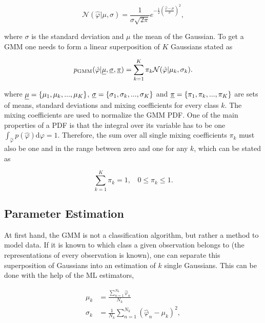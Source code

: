 \begin{equation}
\mathcal{N}(\hat{\varphi}|\mu,\sigma)=\frac{1}{\sigma\sqrt{2\pi}}e^{-\frac{1}{2}(\frac{\hat{\varphi}-\mu}{\sigma})^2},
\end{equation}

where $\sigma$ is the standard deviation and $\mu$ the mean of the Gaussian.
To get a \ac{GMM} one needs to form a linear superposition of $K$ Gaussians stated as

\begin{equation}
p_{\text{GMM}}(\hat{\varphi}|\underline{\mu},\underline{\sigma},\underline{\pi})= \sum^K_{k=1}\pi_k\mathcal{N}(\hat{\varphi}|\mu_k,\sigma_k).
\label{eq:gmm}
\end{equation}

where $\underline{\mu} = \{\mu_1, \mu_k,...,\mu_K \}$, $\underline{\sigma} = \{\sigma_1, \sigma_k,...,\sigma_K \}$ and $\underline{\pi} = \{\pi_1, \pi_k,...,\pi_K \}$ are sets of means, standard deviations and mixing coefficients for every class $k$. The mixing coefficients are used to normalize the \ac{GMM} \ac{PDF}. One of the main properties of a \ac{PDF} is that the integral over its variable has to be one $\int_{\hat \varphi} p(\hat \varphi) \mathrm{d} \varphi =1$. Therefore, the sum over all  single mixing coefficients $\pi_k$ must also be one and in the range between zero and one for any $k$, which can be stated as

\begin{equation}
\sum^K_{k=1}\pi_k = 1, \ \ \ \ 0 \leqslant \pi_k \leqslant 1.
\label{eq:pi_constraint}
\end{equation}

\subsection{Parameter Estimation}
\label{subsec:parameter_est}

At first hand, the GMM is not a classification algorithm, but rather a method to model data.
If it is known to which class a given observation belongs to (the representations of every observation is known), one can separate this superposition of Gaussians into an estimation of $k$ single Gaussians. This can be done with the help of the \ac{ML} estimators,

\begin{equation}
\begin{split}
\mu_k &= \frac{\sum^{N_k}_{n=1}\hat{\varphi}_n}{N_k}\\
\sigma_k &= \frac{1}{N_k}\sum^{N_k}_{n=1}(\hat{\varphi}_n-\mu_k)^2,
\end{split}
\end{equation}

